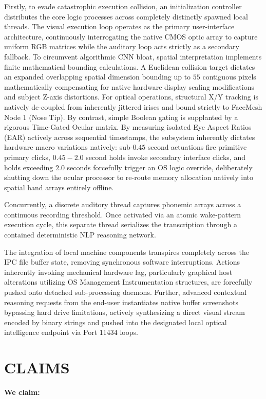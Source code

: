 \documentclass[12pt, a4paper]{article}
\begin{document}
Firstly, to evade catastrophic execution collision, an initialization controller distributes the core logic processes across completely distinctly spawned local threads. The visual execution loop operates as the primary user-interface architecture, continuously interrogating the native CMOS optic array to capture uniform RGB matrices while the auditory loop acts strictly as a secondary fallback. To circumvent algorithmic CNN bloat, spatial interpretation implements finite mathematical bounding calculations. A Euclidean collision target dictates an expanded overlapping spatial dimension bounding up to $55$ contiguous pixels mathematically compensating for native hardware display scaling modifications and subject Z-axis distortions. For optical operations, structural X/Y tracking is natively de-coupled from inherently jittered irises and bound strictly to FaceMesh Node 1 (Nose Tip). By contrast, simple Boolean gating is supplanted by a rigorous Time-Gated Ocular matrix. By measuring isolated Eye Aspect Ratios (EAR) actively across sequential timestamps, the subsystem inherently dictates hardware macro variations natively: sub-$0.45$ second actuations fire primitive primary clicks, $0.45-2.0$ second holds invoke secondary interface clicks, and holds exceeding $2.0$ seconds forcefully trigger an OS logic override, deliberately shutting down the ocular processor to re-route memory allocation natively into spatial hand arrays entirely offline.

Concurrently, a discrete auditory thread captures phonemic arrays across a continuous recording threshold. Once activated via an atomic wake-pattern execution cycle, this separate thread serializes the transcription through a contained deterministic NLP reasoning network. 

The integration of local machine components transpires completely across the IPC file buffer state, removing synchronous software interruptions. Actions inherently invoking mechanical hardware lag, particularly graphical host alterations utilizing OS Management Instrumentation structures, are forcefully pushed onto detached sub-processing daemons. Further, advanced contextual reasoning requests from the end-user instantiates native buffer screenshots bypassing hard drive limitations, actively synthesizing a direct visual stream encoded by binary strings and pushed into the designated local optical intelligence endpoint via Port 11434 loops.

\newpage

\section*{CLAIMS}
\textbf{We claim:}
\end{document}
